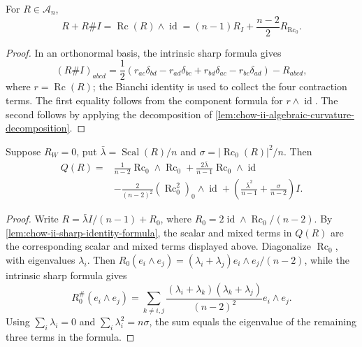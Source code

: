 \begin{lemma}
  \label{lem:chow-ii-sharp-identity-formula}
  For \(R\in\mathcal A_n\),
  \[
    R+R\#I=\operatorname{Rc}(R)\wedge\operatorname{id}
      =(n-1)R_I+\frac{n-2}{2}R_{\operatorname{Rc}_0}.
  \]
\end{lemma}
\begin{proof}
\sketch
  In an orthonormal basis, the intrinsic sharp formula gives
  \[
  (R\#I)_{abcd}=\frac12(r_{ac}\delta_{bd}-r_{ad}\delta_{bc}
    +r_{bd}\delta_{ac}-r_{bc}\delta_{ad})-R_{abcd},
  \]
  where \(r=\operatorname{Rc}(R)\); the Bianchi identity is used to collect
  the four contraction terms.  The first equality follows from the component
  formula for \(r\wedge\operatorname{id}\).  The second follows by applying
  the decomposition of \ref{lem:chow-ii-algebraic-curvature-decomposition}.
\end{proof}

\begin{lemma}
  \label{lem:chow-ii-quadratic-zero-weyl}
  Suppose \(R_W=0\), put
  \(\bar\lambda=\operatorname{Scal}(R)/n\) and
  \(\sigma=|\operatorname{Rc}_0(R)|^2/n\).  Then
  \[
  \begin{aligned}
  Q(R)={}&\frac1{n-2}\operatorname{Rc}_0\wedge\operatorname{Rc}_0
   +\frac{2\bar\lambda}{n-1}\operatorname{Rc}_0\wedge\operatorname{id}\\
   &-\frac2{(n-2)^2}(\operatorname{Rc}_0^2)_0\wedge\operatorname{id}
   +\left(\frac{\bar\lambda^2}{n-1}+\frac\sigma{n-2}\right)I.
  \end{aligned}
  \]
\end{lemma}
\begin{proof}
\sketch
  Write \(R=\bar\lambda I/(n-1)+R_0\), where
  \(R_0=2\operatorname{id}\wedge\operatorname{Rc}_0/(n-2)\).  By
  \ref{lem:chow-ii-sharp-identity-formula}, the scalar and mixed terms in
  \(Q(R)\) are the corresponding scalar and mixed terms displayed above.
  Diagonalize \(\operatorname{Rc}_0\), with eigenvalues \(\lambda_i\).  Then
  \(R_0(e_i\wedge e_j)=(\lambda_i+\lambda_j)e_i\wedge e_j/(n-2)\), while the
  intrinsic sharp formula gives
  \[
  R_0^\#(e_i\wedge e_j)=\sum_{k\ne i,j}
    \frac{(\lambda_i+\lambda_k)(\lambda_k+\lambda_j)}{(n-2)^2}
      e_i\wedge e_j.
  \]
  Using \(\sum_i\lambda_i=0\) and \(\sum_i\lambda_i^2=n\sigma\), the sum
  equals the eigenvalue of the remaining three terms in the formula.
\end{proof}

